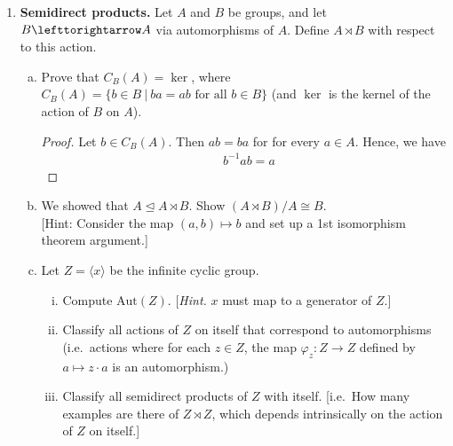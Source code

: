 \documentclass[11pt, reqno]{amsart}
\theoremstyle{plain}
\theoremstyle{definition}
\theoremstyle{example}
\def\<{\langle} \def\>{\rangle}
\def\acts{\lefttorightarrow}
\def\Aut{\mathrm{Aut}}
\def\f{\varphi}
\def\normeq{\unlhd}
\begin{document}
\begin{enumerate}[1.]
\begin{enumerate}[(a)]
\end{enumerate}


\item \textbf{Semidirect products.} Let $A$ and $B$ be groups, and let $B \acts A$ via automorphisms of $A$. Define $A \rtimes B$ with respect to this action.
\begin{enumerate}[(a)]
\item Prove that $C_B(A) = \ker$, where $C_B(A) = \{b \in B ~|~ ba = ab \text{ for all }b \in B\}$ (and $\ker$ is the kernel of the action of $B$ on $A$). 

\begin{proof}
Let $b \in C_B(A)$. Then $ab = ba$ for for every $a \in A$. Hence, we have
\begin{align*}
&b^{-1}ab = a
\end{align*}
\end{proof}
\item We showed that $A \normeq A \rtimes B$. Show $(A \rtimes B)/A \cong B$. \\
{[Hint: Consider the map $(a,b) \mapsto b$ and set up a 1st isomorphism theorem argument.]}
\item Let $Z= \<x\>$ be the infinite cyclic group.
\begin{enumerate}[(i)]
\item Compute $\Aut(Z)$. {[\emph{Hint.} $x$ must map to a generator of $Z$.]}
\item Classify all actions of $Z$ on itself that correspond to automorphisms (i.e.\ actions where for each $z \in Z$, the map $\f_z: Z \to Z$ defined by $a \mapsto z \cdot a$ is an automorphism.)
\item Classify all semidirect products of $Z$ with itself. {[i.e.\ How many examples are there of $Z \rtimes Z$, which depends intrinsically on the action of $Z$ on itself.]}
\end{enumerate}
\end{enumerate}
\end{enumerate}
\end{document}
